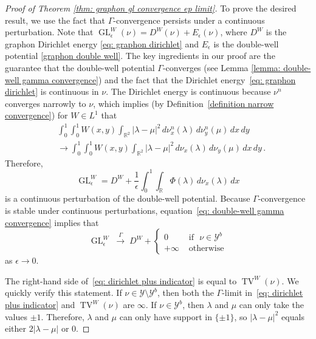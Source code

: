 \documentclass[11pt]{amsart}
\def\R{\mathbb{R}}
\def\ep{\epsilon}
\def\ra{\rightarrow}
\def\gamra{\stackrel{\Gamma}{\longrightarrow}}
\def\GL{\operatorname{GL}}
\def\TV{\operatorname{TV}}
\numberwithin{equation}{section}
\begin{document}
{\begin{proof}[Proof of Theorem \ref{thm: graphon gl convergence ep limit}]

To prove the desired result, we use the fact that $\Gamma$-convergence persists under a continuous perturbation. Note that $\GL^W_\ep(\nu) = D^W(\nu) + E_\ep(\nu)$, where $D^W$ is the graphon Dirichlet energy \eqref{eq: graphon dirichlet} and $E_\ep$ is the double-well potential \eqref{graphon double well}. {The key ingredients in our proof are} the guarantee 
that the double-well potential $\Gamma$-converges (see Lemma \ref{lemma: double-well gamma convergence}) and {the fact} that the Dirichlet energy~\eqref{eq: graphon dirichlet} is continuous in $\nu$. {The Dirichlet energy} is continuous because $\nu^n$ converges narrowly to $\nu$, which implies (by Definition~\eqref{definition narrow convergence}) for $W \in L^1$ that
\begin{align*}
&  \int_0^1\int_0^1 W(x,y) \int_{\R^2} |\lambda-\mu|^2 \,d\nu^n_x(\lambda)\,d\nu^n_y(\mu) \,dx\,dy \\
& \ra \int_0^1 \int_0^1 W(x,y) \int_{\R^2} |\lambda-\mu|^2 \,d\nu_x(\lambda)\,d\nu_y(\mu) \,dx\,dy\,.
\end{align*}
Therefore, 
\begin{equation*}
    \GL^W_\ep = D^W + \frac{1}{\ep} \int_0^1 \int_\R \Phi(\lambda)\,d\nu_x(\lambda) \, dx 
\end{equation*}	
is a continuous perturbation of the double-well potential. Because $\Gamma$-convergence is stable under continuous perturbations, equation~\eqref{eq: double-well gamma convergence} implies that
\begin{equation}
    \label{eq: dirichlet plus indicator}
    \GL^W_\ep \; \gamra \; D^W + \begin{cases}
        0 &\text{ if } \,\, \nu \in \mathcal{Y}^b \\
        + \infty &\text{ otherwise} 
    \end{cases}
\end{equation}
as $\ep \ra 0$.

The right-hand side of~\eqref{eq: dirichlet plus indicator}  is {equal to} $\TV^W(\nu)$. We quickly verify this statement. If $\nu \in \mathcal{Y} \setminus \mathcal{Y}^b$, then both the $\Gamma$-limit in~\eqref{eq: dirichlet plus indicator} and $\TV^W(\nu)$ are $\infty$. If $\nu \in \mathcal{Y}^b$, then $\lambda$ and $\mu$ can only take the values $\pm 1$. Therefore, $\lambda$ and $\mu$ can only {have support in $\{\pm 1\}$}, so $|\lambda - \mu|^2$ equals either $2|\lambda - \mu|$ or $0$. 
\end{proof}

}
\end{document}
